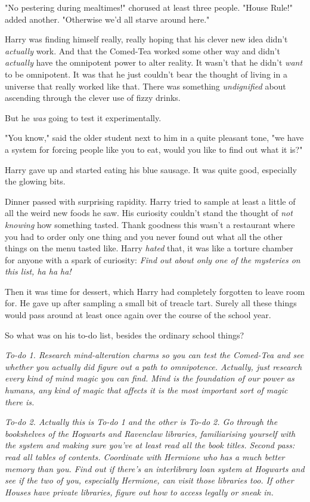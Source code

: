 "No pestering during mealtimes!" chorused at least three people. "House Rule!"
added another. "Otherwise we'd all starve around here."

Harry was finding himself really, really hoping that his clever new idea didn't
\emph{actually} work. And that the Comed-Tea worked some other way and didn't
\emph{actually} have the omnipotent power to alter reality. It wasn't that he
didn't \emph{want} to be omnipotent. It was that he just couldn't bear the
thought of living in a universe that really worked like that. There was
something \emph{undignified} about ascending through the clever use of fizzy
drinks.

But he \emph{was} going to test it experimentally.

"You know," said the older student next to him in a quite pleasant tone, "we
have a system for forcing people like you to eat, would you like to find out
what it is?"

Harry gave up and started eating his blue sausage. It was quite good,
especially the glowing bits.

Dinner passed with surprising rapidity. Harry tried to sample at least a little
of all the weird new foods he saw. His curiosity couldn't stand the thought of
\emph{not knowing} how something tasted. Thank goodness this wasn't a
restaurant where you had to order only one thing and you never found out what
all the other things on the menu tasted like. Harry \emph{hated} that, it was
like a torture chamber for anyone with a spark of curiosity: \emph{Find out
about only one of the mysteries on this list, ha ha ha!}

Then it was time for dessert, which Harry had completely forgotten to leave
room for. He gave up after sampling a small bit of treacle tart. Surely all
these things would pass around at least once again over the course of the
school year.

So what was on his to-do list, besides the ordinary school things?

\emph{To-do 1. Research mind-alteration charms so you can test the Comed-Tea
and see whether you actually did figure out a path to omnipotence. Actually,
just research every kind of mind magic you can find. Mind is the foundation of
our power as humans, any kind of magic that affects it is the most important
sort of magic there is.}

\emph{To-do 2. Actually this is To-do 1 and the other is To-do 2. Go through
the bookshelves of the Hogwarts and Ravenclaw libraries, familiarising yourself
with the system and making sure you've at least read all the book titles.
Second pass: read all tables of contents. Coordinate with Hermione who has a
much better memory than you. Find out if there's an interlibrary loan system at
Hogwarts and see if the two of you, especially Hermione, can visit those
libraries too. If other Houses have private libraries, figure out how to access
legally or sneak in.}

